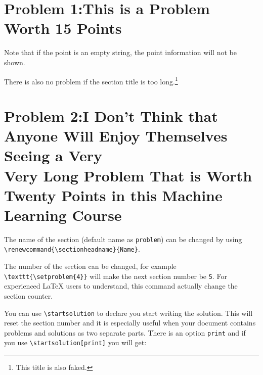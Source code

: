 \documentclass[oneside]{seu-ml-assign}
\renewcommand{\sectionheadname}{Section}
\begin{document}
      \renewcommand{\sectionheadname}{Problem}

      \section*{Problem 1:\hspace{0.33em}This is a Problem Worth 15 Points}
      Note that if the point is an empty string, the point information will not be shown.

      There is also no problem if the section title is too long.\footnote{This title is also faked.}\vspace{-8mm}

      \section*{Problem 2:\hspace{0.33em}I Don't Think that Anyone Will Enjoy Themselves Seeing a Very\\\hspace{5.2em}Very Long Problem That is Worth Twenty Points in this Machine\\\hspace{5.2em}Learning Course}

      \renewcommand{\sectionheadname}{Section}

      The name of the section (default name as \texttt{problem}) can be changed by using \verb|\renewcommand{\sectionheadname}{Name}|.

    The number of the section can be changed, for example \verb|\texttt{\setproblem{4}}| will make the next section number be \texttt{5}.
    For experienced \LaTeX{} users to understand, this command actually change the section counter.

    You can use \verb|\startsolution| to declare you start writing the solution.
    This will reset the section number and it is especially useful when your document contains problems and solutions as two separate parts.
    There is an option \texttt{print} and if you use \verb|\startsolution[print]| you will get:
    \vspace{-\baselineskip}
\end{document}
